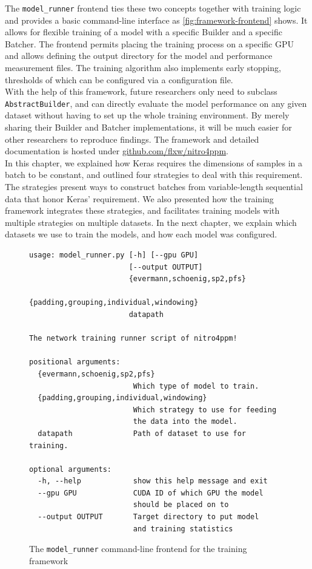 \noindent The \verb=model_runner= frontend ties these two concepts together with training logic and provides a basic command-line interface as \autoref{fig:framework-frontend} shows. It allows for flexible training of a model with a specific Builder and a specific Batcher. The frontend permits placing the training process on a specific GPU and allows defining the output directory for the model and performance measurement files. The training algorithm also implements early stopping, thresholds of which can be configured via a configuration file.\\

With the help of this framework, future researchers only need to subclass \verb=AbstractBuilder=, and can directly evaluate the model performance on any given dataset without having to set up the whole training environment. By merely sharing their Builder and Batcher implementations, it will be much easier for other researchers to reproduce findings. The framework and detailed documentation is hosted under \href{https://github.com/flxw/nitro4ppm}{github.com/flxw/nitro4ppm}.\\

In this chapter, we explained how Keras requires the dimensions of samples in a batch to be constant,
and outlined four strategies to deal with this requirement.
The strategies present ways to construct batches from variable-length sequential data that honor Keras' requirement.
We also presented how the training framework integrates these strategies, and
facilitates training models with multiple strategies on multiple datasets.
In the next chapter, we explain which datasets we use to train the models,
and how each model was configured.

\begin{figure}[!htb]
\centering
\begin{verbatim}
usage: model_runner.py [-h] [--gpu GPU]
                       [--output OUTPUT]
                       {evermann,schoenig,sp2,pfs}
                       {padding,grouping,individual,windowing}
                       datapath

The network training runner script of nitro4ppm!

positional arguments:
  {evermann,schoenig,sp2,pfs}
                        Which type of model to train.
  {padding,grouping,individual,windowing}
                        Which strategy to use for feeding
                        the data into the model.
  datapath              Path of dataset to use for training.

optional arguments:
  -h, --help            show this help message and exit
  --gpu GPU             CUDA ID of which GPU the model
                        should be placed on to
  --output OUTPUT       Target directory to put model
                        and training statistics
\end{verbatim}
\caption[CLI frontend for the framework]{The \texttt{model\_runner} command-line frontend for the training framework}
\label{fig:framework-frontend}
\end{figure}
